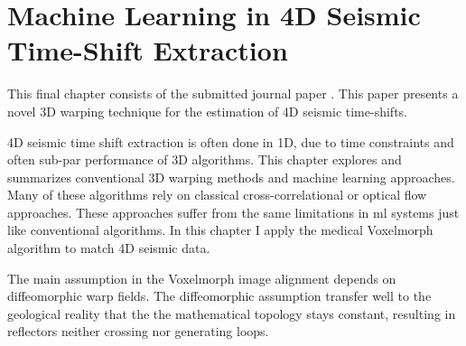 \section{Machine Learning in 4D Seismic Time-Shift Extraction}

This final chapter consists of the submitted journal paper . This paper presents a novel 3D warping technique for the estimation of 4D seismic time-shifts.

4D seismic time shift extraction is often done in 1D, due to time constraints and often sub-par performance of 3D algorithms. This chapter explores and summarizes conventional 3D warping methods and machine learning approaches. Many of these algorithms rely on classical cross-correlational or optical flow approaches. These approaches suffer from the same limitations in \acl{ml} systems just like conventional algorithms. In this chapter I apply the medical Voxelmorph algorithm to match 4D seismic data.

The main assumption in the Voxelmorph image alignment depends on diffeomorphic warp fields. The diffeomorphic assumption transfer well to the geological reality that the the mathematical topology stays constant, resulting in reflectors neither crossing nor generating loops. 





